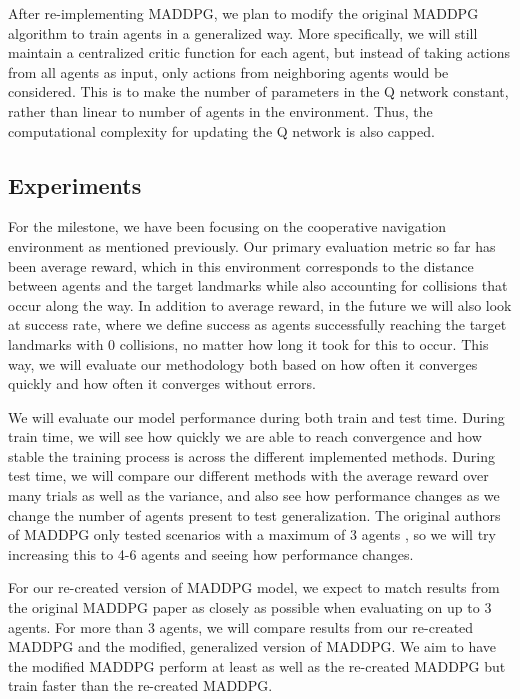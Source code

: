 \documentclass{article}
\begin{document}
After re-implementing MADDPG, we plan to modify the original MADDPG algorithm to train agents in a generalized way. More specifically, we will still maintain a centralized critic function for each agent, but instead of taking actions from all agents as input, only actions from neighboring agents would be considered. This is to make the number of parameters in the Q network constant, rather than linear to number of agents in the environment. Thus, the computational complexity for updating the Q network is also capped.

\subsection{Experiments}

For the milestone, we have been focusing on the cooperative navigation environment as mentioned previously. Our primary evaluation metric so far has been average reward, which in this environment corresponds to the distance between agents and the target landmarks while also accounting for collisions that occur along the way. In addition to average reward, in the future we will also look at success rate, where we define success as agents successfully reaching the target landmarks with 0 collisions, no matter how long it took for this to occur. This way, we will evaluate our methodology both based on how often it converges quickly and how often it converges without errors.

We will evaluate our model performance during both train and test time. During train time, we will see how quickly we are able to reach convergence and how stable the training process is across the different implemented methods. During test time, we will compare our different methods with the average reward over many trials as well as the variance, and also see how performance changes as we change the number of agents present to test generalization. The original authors of MADDPG only tested scenarios with a maximum of 3 agents , so we will try increasing this to 4-6 agents and seeing how performance changes.

For our re-created version of MADDPG model, we expect to match results from the original MADDPG paper as closely as possible when evaluating on up to 3 agents. For more than 3 agents, we will compare results from our re-created MADDPG and the modified, generalized version of MADDPG. We aim to have the modified MADDPG perform at least as well as the re-created MADDPG but train faster than the re-created MADDPG.
\end{document}
